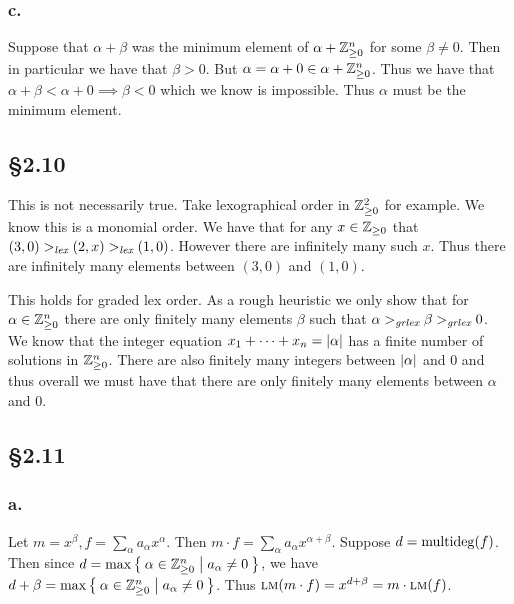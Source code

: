 \documentclass[letterpaper]{article}
\begin{document}
\subsubsection*{c.}

Suppose that $\alpha + \beta$ was the minimum element of $\alpha + \mathbb{Z}_{\geq 0}^{n}$ for some $\beta \neq 0$.
Then in particular we have that $\beta > 0$.
But $\alpha = \alpha + 0 \in \alpha + \mathbb{Z}_{\geq 0}^{n}$.
Thus we have that $\alpha + \beta < \alpha + 0 \implies \beta < 0$ which we know is impossible.
Thus $\alpha$ must be the minimum element.

\subsection*{\S 2.10}

This is not necessarily true.
Take lexographical order in $\mathbb{Z}_{\geq 0}^{2}$ for example.
We know this is a monomial order.
We have that for any $x \in \mathbb{Z}_{\geq 0}$ that $(3, 0) >_{\emph{lex}} (2, x)  >_{\emph{lex}} (1, 0)$.
However there are infinitely many such $x$.
Thus there are infinitely many elements between $(3, 0)$ and $(1, 0)$.

This holds for graded lex order.
As a rough heuristic we only show that for $\alpha \in \mathbb{Z}_{\geq 0}^{n}$ there are only finitely many elements $\beta$ such that $\alpha >_{\emph{grlex}} \beta >_{\emph{grlex}} 0$.
We know that the integer equation $x_{1} + \cdots + x_{n} = \abs{\alpha}$ has a finite number of solutions in $\mathbb{Z}_{\geq 0}^{n}$.
There are also finitely many integers between $\abs{\alpha}$ and $0$ and thus overall we must have that there are only finitely many elements between $\alpha$ and $0$.


\subsection*{\S 2.11}

\subsubsection*{a.}

Let $m = x^{\beta}, f = \sum_{\alpha} a_{\alpha}x^{\alpha}$.
Then $m \cdot f = \sum_{\alpha} a_{\alpha} x^{\alpha + \beta}$.
Suppose $d = \operatorname{multideg}(f)$.
Then since $d = \max\Set{\alpha \in \mathbb{Z}_{\geq 0}^{n} | a_{\alpha} \neq 0}$, we have $d + \beta = \max\Set{\alpha \in \mathbb{Z}_{\geq 0}^{n} | a_{\alpha} \neq 0}$.
Thus $\operatorname{\textsc{lm}}(m \cdot f) = x^{d + \beta} = m \cdot \operatorname{\textsc{lm}}(f)$.
\end{document}
